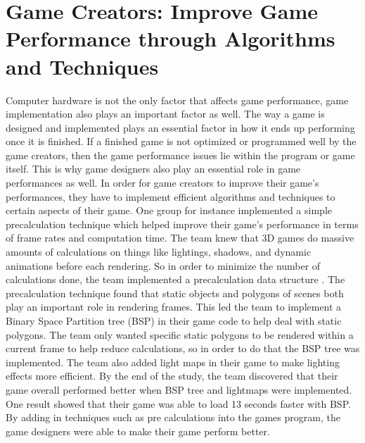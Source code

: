 \documentclass{article}
\begin{document}
\section{Game Creators: Improve Game Performance through Algorithms and Techniques}
Computer hardware is not the only factor that affects game performance, game implementation also plays an important factor as well. The way a game is designed and implemented plays an essential factor in how it ends up performing once it is finished. If a finished game is not optimized or programmed well by the game creators, then the game performance issues lie within the program or game itself. This is why game designers also play an essential role in game performances as well. In order for game creators to improve their game’s performances, they have to implement efficient algorithms and techniques to certain aspects of their game. One group for instance implemented a simple precalculation technique which helped improve their game’s performance in terms of frame rates and computation time. The team knew that 3D games do massive amounts of calculations on things like lightings, shadows, and dynamic animations before each rendering. So in order to minimize the number of calculations done, the team implemented a precalculation data structure \cite{4133456}. The precalculation technique found that static objects and polygons of scenes both play an important role in rendering frames. This led the team to implement a Binary Space Partition tree (BSP) in their game code to help deal with static polygons. The team only wanted specific static polygons to be rendered within a current frame to help reduce calculations, so in order to do that the BSP tree was implemented. The team also added light maps in their game to make lighting effects more efficient. By the end of the study, the team discovered that their game overall performed better when BSP tree and lightmaps were implemented. One result showed that their game was able to load 13 seconds faster with BSP. By adding in techniques such as pre calculations into the games program, the game designers were able to make their game perform better. 
\end{document}
